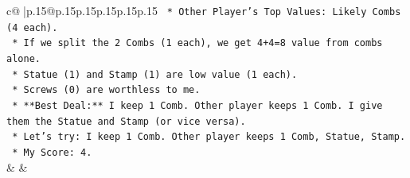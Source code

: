 \documentclass{article}
\begin{document}
{\begin{supertabular}{c@{$\;$}|p{.15\linewidth}@{}p{.15\linewidth}p{.15\linewidth}p{.15\linewidth}p{.15\linewidth}p{.15\linewidth}}
{{{\texttt{        *   Other Player's Top Values: Likely Combs (4 each).} \\
\texttt{        *   If we split the 2 Combs (1 each), we get 4+4=8 value from combs alone.} \\
\texttt{        *   Statue (1) and Stamp (1) are low value (1 each).} \\
\texttt{        *   Screws (0) are worthless to me.} \\
\texttt{        *   **Best Deal:** I keep 1 Comb. Other player keeps 1 Comb. I give them the Statue and Stamp (or vice versa).} \\
\texttt{        *   Let's try: I keep 1 Comb. Other player keeps 1 Comb, Statue, Stamp.} \\
\texttt{        *   My Score: 4.} \\
            }
        }
    }
    & & \\ \\


\end{supertabular}}
\end{document}
